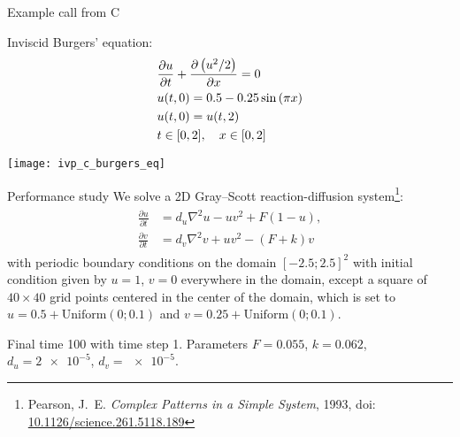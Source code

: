 \documentclass[10pt, aspectratio=169, progressbar=frametitle]{beamer}
\begin{document}
\begin{frame}{Example call from C}
  \begin{minipage}{\dimexpr0.5\textwidth - 2\tabcolsep}
    Inviscid Burgers' equation:
    \begin{align*}
      &\pdv{u}{t} + \pdv{\left( u^{2} / 2 \right)}{x} = 0 \\
      &u(t, 0) = 0.5 - 0.25 \sin \left( \pi x \right)\\
      &u(t, 0) = u(t, 2)\\
      &t \in [0, 2], \quad x \in [0, 2]
    \end{align*}
  \end{minipage}
  \begin{minipage}{\dimexpr0.5\textwidth - 2\tabcolsep}
    \texttt{[image: ivp\_c\_burgers\_eq]}
  \end{minipage}
\end{frame}

\begin{frame}{Performance study}
  We solve a 2D Gray--Scott reaction-diffusion system\footnote{Pearson, J.\ E.
    \emph{Complex Patterns in a Simple System}, 1993, doi:
    \href{https://doi.org/10.1126/science.261.5118.189}{%
      10.1126/science.261.5118.189}}:
  \begin{align*}\label{eq:gs-system}
    \begin{split}
      \frac{\partial u}{\partial t} &= d_u \nabla^2 u - u v^2 + F (1 - u), \\
      \frac{\partial v}{\partial t} &= d_v \nabla^2 v + u v^2 - (F + k) v
    \end{split}
  \end{align*}
  with periodic boundary conditions on the domain $[-2.5; 2.5]^2$ with initial
  condition given by \(u = 1\), \(v = 0\) everywhere in the domain, except
  a square of \(40 \times 40\) grid points  centered in the center of the domain,
  which is set to \(u = 0.5 + \mathrm{Uniform}(0; 0.1)\)
  and \(v = 0.25 + \mathrm{Uniform}(0; 0.1)\).

  Final time 100 with time step 1.
  Parameters \(F = 0.055\), \(k = 0.062\), \(d_u = \num{2e-5}\),
  \(d_v = \num{e-5}\).
\end{frame}
\end{document}

